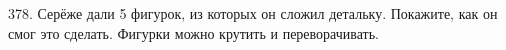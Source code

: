 378. Серёже дали 5 фигурок, из которых он сложил детальку. Покажите, как он смог это сделать.
Фигурки можно крутить и переворачивать.\\
\begin{figure}[ht!]
\end{figure}\\
